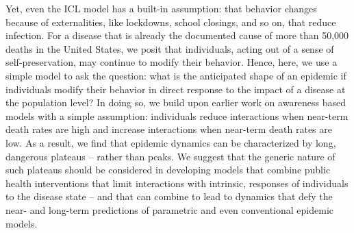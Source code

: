 Yet, even the ICL model has a built-in assumption: that 
behavior changes because of externalities, like lockdowns,
school closings, and so on, that reduce infection.  For a disease
that is already the documented cause of more than 50,000 deaths
in the United States, we posit that individuals, acting
out of a sense of self-preservation, may continue to modify
their behavior.  Hence, here, we use a simple model to
ask the question: what is the anticipated
shape of an epidemic if individuals modify their behavior in direct
response to the impact of a disease at the population level? In doing so,
we build upon earlier work on awareness based models with a
simple assumption: individuals reduce interactions when near-term
death rates are high and increase interactions when near-term death
rates are low.  As a result, we find that epidemic dynamics
can be characterized by long, dangerous plateaus -- rather than peaks.
We suggest that the generic nature of such plateaus should
be considered in developing models that combine
public health interventions that limit interactions with
intrinsic, responses of individuals to the disease state -- and that
can combine to lead to dynamics that defy the near- and long-term
predictions of parametric and even conventional epidemic models.


